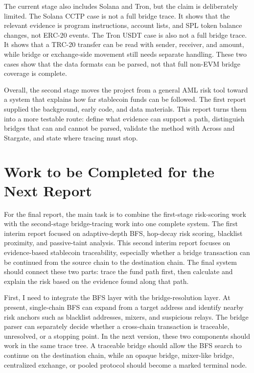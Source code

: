 \documentclass[12pt,a4paper]{article}
\begin{document}
The current stage also includes Solana and Tron, but the claim is deliberately limited. The Solana CCTP case is not a full bridge trace. It shows that the relevant evidence is program instructions, account lists, and SPL token balance changes, not ERC-20 events. The Tron USDT case is also not a full bridge trace. It shows that a TRC-20 transfer can be read with sender, receiver, and amount, while bridge or exchange-side movement still needs separate handling. These two cases show that the data formats can be parsed, not that full non-EVM bridge coverage is complete.

Overall, the second stage moves the project from a general AML risk tool toward a system that explains how far stablecoin funds can be followed. The first report supplied the background, early code, and data materials. This report turns them into a more testable route: define what evidence can support a path, distinguish bridges that can and cannot be parsed, validate the method with Across and Stargate, and state where tracing must stop.

\section{Work to be Completed for the Next Report}

For the final report, the main task is to combine the first-stage risk-scoring work with the second-stage bridge-tracing work into one complete system. The first interim report focused on adaptive-depth BFS, hop-decay risk scoring, blacklist proximity, and passive-taint analysis. This second interim report focuses on evidence-based stablecoin traceability, especially whether a bridge transaction can be continued from the source chain to the destination chain. The final system should connect these two parts: trace the fund path first, then calculate and explain the risk based on the evidence found along that path.

First, I need to integrate the BFS layer with the bridge-resolution layer. At present, single-chain BFS can expand from a target address and identify nearby risk anchors such as blacklist addresses, mixers, and suspicious relays. The bridge parser can separately decide whether a cross-chain transaction is traceable, unresolved, or a stopping point. In the next version, these two components should work in the same trace tree. A traceable bridge should allow the BFS search to continue on the destination chain, while an opaque bridge, mixer-like bridge, centralized exchange, or pooled protocol should become a marked terminal node.
\end{document}
